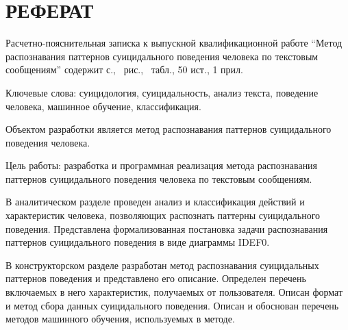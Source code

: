 \section*{РЕФЕРАТ}

Расчетно-пояснительная записка к выпускной квалификационной работе ``Метод распознавания паттернов суицидального поведения человека по текстовым сообщениям'' содержит \pageref{LastPage} с., \totalfigures\ рис., \totaltables\ табл., 50 ист., 1 прил.

Ключевые слова: суицидология, суицидальность, анализ текста, поведение человека, машинное обучение, классификация.

Объектом разработки является метод распознавания паттернов суицидального поведения человека.

Цель работы: разработка и программная реализация метода распознавания паттернов суицидального поведения человека по текстовым сообщениям.

В аналитическом разделе проведен анализ и классификация действий и характеристик человека, позволяющих распознать паттерны суицидального поведения. 
Представлена формализованная постановка задачи распознавания паттернов суицидального поведения в виде диаграммы IDEF0.


В конструкторском разделе разработан метод распознавания суицидальных паттернов поведения и представлено его описание.
Определен перечень включаемых в него характеристик, получаемых от пользователя.
Описан формат и метод сбора данных суицидального поведения.
Описан и обоснован перечень методов машинного обучения, используемых в методе.


